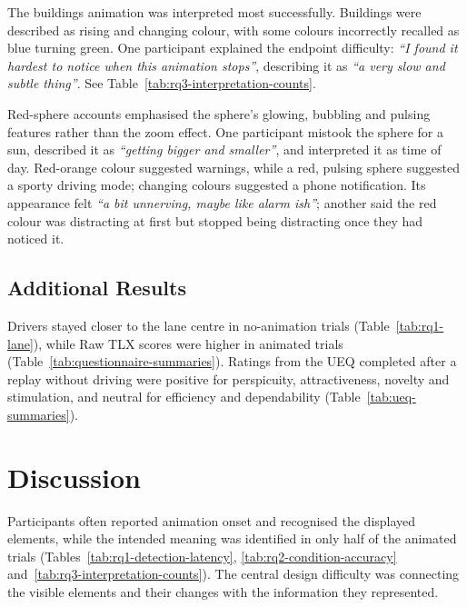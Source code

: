 \documentclass[
english,                 %
bibtex,                  %
includeExtraAbstracts, %
]{kththesis}
\numberwithin{listing}{chapter}
\begin{document}
The buildings animation was interpreted most successfully. Buildings were described as rising and changing colour, with some colours incorrectly recalled as blue turning green. One participant explained the endpoint difficulty: \textit{``I found it hardest to notice when this animation stops''}, describing it as \textit{``a very slow and subtle thing''}. See Table~\ref{tab:rq3-interpretation-counts}.

Red-sphere accounts emphasised the sphere's glowing, bubbling and pulsing features rather than the zoom effect. One participant mistook the sphere for a sun, described it as \textit{``getting bigger and smaller''}, and interpreted it as time of day. Red-orange colour suggested warnings, while a red, pulsing sphere suggested a sporty driving mode; changing colours suggested a phone notification. Its appearance felt \textit{``a bit unnerving, maybe like alarm ish''}; another said the red colour was distracting at first but stopped being distracting once they had noticed it.

\section{Additional Results}
\label{sec:add-results}

Drivers stayed closer to the lane centre in no-animation trials (Table~\ref{tab:rq1-lane}), while Raw TLX scores were higher in animated trials (Table~\ref{tab:questionnaire-summaries}). Ratings from the UEQ completed after a replay without driving were positive for perspicuity, attractiveness, novelty and stimulation, and neutral for efficiency and dependability (Table~\ref{tab:ueq-summaries}).

\setcounter{secnumdepth}{1}


\FloatBarrier
\endgroup
\setcounter{topnumber}{2}
\setcounter{totalnumber}{3}

\chapter{Discussion}
\label{ch:discussion}

Participants often reported animation onset and recognised the displayed elements, while the intended meaning was identified in only half of the animated trials (Tables~\ref{tab:rq1-detection-latency}, \ref{tab:rq2-condition-accuracy} and~\ref{tab:rq3-interpretation-counts}). The central design difficulty was connecting the visible elements and their changes with the information they represented.
\end{document}
